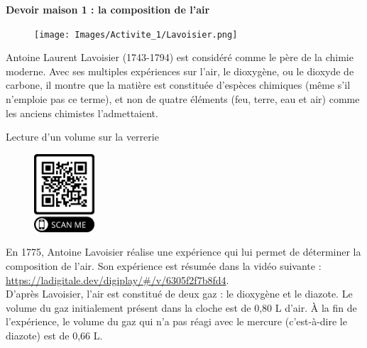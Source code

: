 \renewcommand{\thesubsection}{\textcolor{red}{\Roman{section}.\arabic{subsection}}}
\renewcommand{\thesubsubsection}{\textcolor{red}{\Roman{section}.\arabic{subsection}.\alph{subsubsection}}}

\setcounter{section}{0}
\setcounter{document}{0}
\sndEnTeteDMUn

\begin{center}
\begin{mdframed}[style=titr, leftmargin=60pt, rightmargin=60pt, innertopmargin=7pt, innerbottommargin=7pt, innerrightmargin=8pt, innerleftmargin=8pt]

\begin{center}
\large{\textbf{Devoir maison 1 : la composition de l'air}}
\end{center}

\end{mdframed}
\end{center}

\begin{figure}
\vspace{-1cm}
    \centering
      \texttt{[image: Images/Activite\_1/Lavoisier.png]}
  \end{figure}
Antoine Laurent Lavoisier (1743-1794) est considéré comme le père de la chimie moderne. Avec ses multiples expériences sur l’air, le dioxygène, ou le dioxyde de carbone, il montre que la matière est
constituée d’espèces chimiques (même s’il n’emploie pas ce terme), et non de quatre éléments (feu, terre, eau et air) comme les anciens chimistes
l’admettaient.\\
\newline

\begin{doc}{Lecture d'un volume sur la verrerie}
\begin{figure}
\vspace{-1cm}
    \centering
      \includegraphics[width=0.2\textwidth]{Images/DM/Qr_code_Lavoisier.png}
  \end{figure}
En 1775, Antoine Lavoisier réalise une expérience qui lui permet de déterminer la composition de l’air.
Son expérience est résumée dans la vidéo suivante : \url{https://ladigitale.dev/digiplay/#/v/6305f2f7b8fd4}.\\
D’après Lavoisier, l’air est constitué de deux gaz : le dioxygène et le diazote. Le volume du gaz initialement
présent dans la cloche est de 0,80 L d’air. À la fin de l’expérience, le volume du gaz qui n’a pas réagi avec le
mercure (c’est-à-dire le diazote) est de 0,66 L.
\end{doc}

